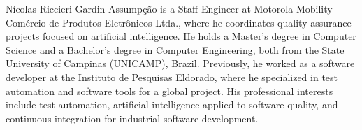 \documentclass[10pt,journal,compsoc]{IEEEtran}
\begin{document}
\begin{IEEEbiographynophoto}{N\'{i}colas Riccieri Gardin Assump\c{c}\~{a}o}
is a Staff Engineer at Motorola Mobility Com\'{e}rcio de Produtos Eletr\^{o}nicos Ltda.,
where he coordinates quality assurance projects focused on artificial intelligence.
He holds a Master's degree in Computer Science and a Bachelor's degree in
Computer Engineering, both from the State University of Campinas (UNICAMP),
Brazil. Previously, he worked as a software developer at the Instituto de
Pesquisas Eldorado, where he specialized in test automation and software tools
for a global project. His professional interests include test automation,
artificial intelligence applied to software quality, and continuous integration
for industrial software development.
\end{IEEEbiographynophoto}
\end{document}

